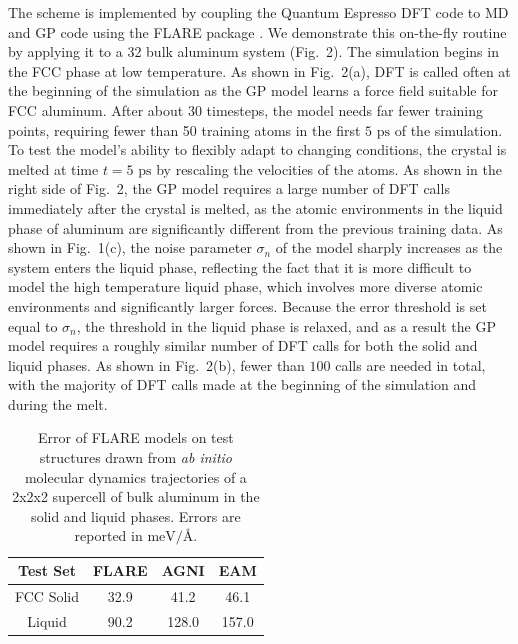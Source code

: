 \documentclass[%
superscriptaddress,
preprint,
linenumbers,
amsmath,amssymb,
aps,
prl,
]{revtex4-1}
\begin{document}
The scheme is implemented by coupling the Quantum Espresso DFT code \cite{giannozzi2009quantum} to MD and GP code using the FLARE package \cite{flare}. We demonstrate this on-the-fly routine by applying it to a 32 bulk aluminum system (Fig.\ 2). The simulation begins in the FCC phase at low temperature. As shown in Fig.\ 2(a), DFT is called often at the beginning of the simulation as the GP model learns a force field suitable for FCC aluminum. After about 30 timesteps, the model needs far fewer training points, requiring fewer than 50 training atoms in the first $5 \text{ ps}$ of the simulation. To test the model's ability to flexibly adapt to changing conditions, the crystal is melted at time $t = 5 \text{ ps}$ by rescaling the velocities of the atoms. As shown in the right side of Fig.\ 2, the GP model requires a large number of DFT calls immediately after the crystal is melted, as the atomic environments in the liquid phase of aluminum are significantly different from the previous training data. As shown in Fig.\ 1(c), the noise parameter $\sigma_n$ of the model sharply increases as the system enters the liquid phase, reflecting the fact that it is more difficult to model the high temperature liquid phase, which involves more diverse atomic environments and significantly larger forces. Because the error threshold is set equal to $\sigma_n$, the threshold in the liquid phase is relaxed, and as a result the GP model requires a roughly similar number of DFT calls for both the solid and liquid phases. As shown in Fig.\ 2(b), fewer than $100$ calls are needed in total, with the majority of DFT calls made at the beginning of the simulation and during the melt.

\begin{table}
	\centering
	\begin{tabular}{c c c c} 
	 \hline
	 \hline
	 Test Set & FLARE & AGNI \cite{botu2016machine} &  EAM \cite{sheng2011highly} \\ 
	 \hline
	 FCC Solid & 32.9 & 41.2 & 46.1 \\ 
	 Liquid & 90.2 & 128.0 & 157.0 \\
	 \hline
	 \hline
	\end{tabular}
\caption{Error of FLARE models on test structures drawn from \textit{ab initio} molecular dynamics trajectories of a 2x2x2 supercell of bulk aluminum in the solid and liquid phases. Errors are reported in $\text{meV/\AA}$.}
\end{table}
\end{document}
